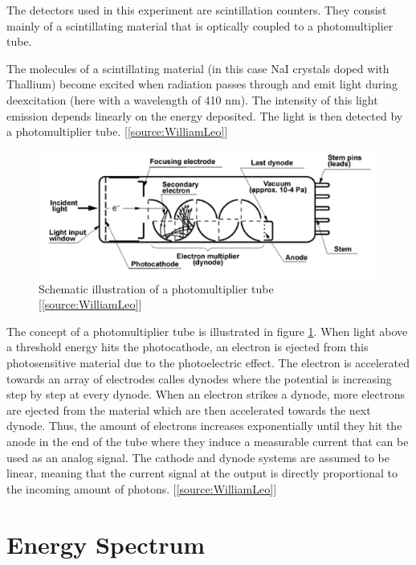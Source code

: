 \documentclass[a4paper,parskip,11pt, DIV12]{scrreprt}
\begin{document}
The detectors used in this experiment are scintillation counters. They consist mainly of a scintillating material that is optically coupled to a photomultiplier tube. 

The molecules of a scintillating material (in this case NaI crystals doped with Thallium) become excited when radiation passes through and emit light during deexcitation (here with a wavelength of 410 nm). The intensity of this light emission depends linearly on the energy deposited. The light is then detected by a photomultiplier tube. [\ref{source:WilliamLeo}]
\begin{figure}[H]
\centering
\includegraphics[scale=1]{Photomultiplier.png}
\caption[Photomultiplier]{Schematic illustration of a photomultiplier tube [\ref{source:WilliamLeo}]}
\label{fig:Photomultiplier}
		\end{figure}
The concept of a photomultiplier tube is illustrated in figure \ref{fig:Photomultiplier}. When light above a threshold energy hits the photocathode, an electron is ejected from this photosensitive material due to the photoelectric effect. The electron is accelerated towards an array of electrodes calles dynodes where the potential is increasing step by step at every dynode. When an electron strikes a dynode, more electrons are ejected from the material which are then accelerated towards the next dynode. Thus, the amount of electrons increases exponentially until they hit the anode in the end of the tube where they induce a measurable current that can be used as an analog signal. The cathode and dynode systems are assumed to be linear, meaning that the current signal at the output is directly proportional to the incoming amount of photons. [\ref{source:WilliamLeo}]

\chapter{Energy Spectrum} \label{sec:EnergySpectrum}
\end{document}
